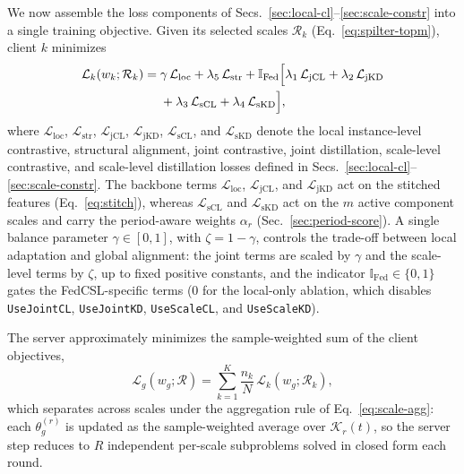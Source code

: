 \documentclass[sigconf]{acmart}
\begin{document}
We now assemble the loss components of
Secs.~\ref{sec:local-cl}--\ref{sec:scale-constr} into a single training
objective. Given its selected scales $\mathcal{R}_k$
(Eq.~\eqref{eq:spilter-topm}), client $k$ minimizes
\begin{equation}
\begin{aligned}
\mathcal{L}_k(w_k;\mathcal{R}_k)
={}& \gamma\,\mathcal{L}_{\mathrm{loc}}
+\lambda_5\,\mathcal{L}_{\mathrm{str}}
+\mathbb{I}_{\mathrm{Fed}}\Bigl[
\lambda_1\,\mathcal{L}_{\mathrm{jCL}}
+\lambda_2\,\mathcal{L}_{\mathrm{jKD}} \\
&+\lambda_3\,\mathcal{L}_{\mathrm{sCL}}
+\lambda_4\,\mathcal{L}_{\mathrm{sKD}}
\Bigr],
\end{aligned}
\label{eq:client-obj}
\end{equation}
where $\mathcal{L}_{\mathrm{loc}}$, $\mathcal{L}_{\mathrm{str}}$,
$\mathcal{L}_{\mathrm{jCL}}$, $\mathcal{L}_{\mathrm{jKD}}$,
$\mathcal{L}_{\mathrm{sCL}}$, and $\mathcal{L}_{\mathrm{sKD}}$ denote the local
instance-level contrastive, structural alignment, joint contrastive, joint
distillation, scale-level contrastive, and scale-level distillation losses
defined in Secs.~\ref{sec:local-cl}--\ref{sec:scale-constr}. The backbone terms
$\mathcal{L}_{\mathrm{loc}}$, $\mathcal{L}_{\mathrm{jCL}}$, and
$\mathcal{L}_{\mathrm{jKD}}$ act on the stitched features
(Eq.~\eqref{eq:stitch}), whereas $\mathcal{L}_{\mathrm{sCL}}$ and
$\mathcal{L}_{\mathrm{sKD}}$ act on the $m$ active component scales and carry
the period-aware weights $\alpha_r$ (Sec.~\ref{sec:period-score}). A single
balance parameter $\gamma\in[0,1]$, with $\zeta=1-\gamma$, controls the
trade-off between local adaptation and global alignment: the joint terms are
scaled by $\gamma$ and the scale-level terms by $\zeta$, up to fixed positive
constants, and the indicator $\mathbb{I}_{\mathrm{Fed}}\in\{0,1\}$ gates the
FedCSL-specific terms ($0$ for the local-only ablation, which disables
\texttt{UseJointCL}, \texttt{UseJointKD}, \texttt{UseScaleCL}, and
\texttt{UseScaleKD}).

The server approximately minimizes the sample-weighted sum of the client
objectives,
\begin{equation}
\mathcal{L}_g(w_g;\mathcal{R})
=\sum_{k=1}^{K}\frac{n_k}{N}\,\mathcal{L}_k(w_g;\mathcal{R}_k),
\label{eq:server-obj}
\end{equation}
which separates across scales under the aggregation rule of
Eq.~\eqref{eq:scale-agg}: each $\theta_g^{(r)}$ is updated as the
sample-weighted average over $\mathcal{K}_r(t)$, so the server step reduces to
$R$ independent per-scale subproblems solved in closed form each round.
\end{document}
